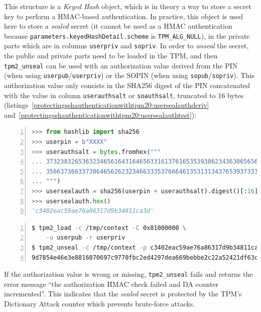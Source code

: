 This structure is a \emph{Keyed Hash} object, which is in theory a way
to store a secret key to perform a HMAC-based authentication. In
practice, this object is used here to store a \emph{sealed} secret (it
cannot be used as a HMAC authentication because
\texttt{parameters.keyedHashDetail.scheme} is
\texttt{TPM\_ALG\_NULL}), in the private parts which
are in columns \texttt{userpriv} and
\texttt{sopriv}. In order to \emph{unseal} the secret,
the public and private parts need to be loaded in the TPM, and then
\texttt{tpm2\_unseal} can be used with an authorization
value derived from the PIN (when using
\texttt{userpub}/\texttt{userpriv}) or
the SOPIN (when using
\texttt{sopub}/\texttt{sopriv}). This
authorization value only consists in the SHA256 digest of the PIN
concatenated with the value in column
\texttt{userauthsalt} or
\texttt{soauthsalt}, truncated to 16 bytes
(listings~\ref{protectingsshauthenticationwithtpm20:usersealauthderiv}
and~\ref{protectingsshauthenticationwithtpm20:usersealauthtest}):

\begin{lstlisting}[language=Python, numbers=left, caption={Python session which computes the authorization value of the \texttt{userpub} field, from the user PIN and \texttt{userauthsalt}}, label=protectingsshauthenticationwithtpm20:usersealauthderiv]
>>> from hashlib import sha256
>>> userpin = b"XXXX"
>>> userauthsalt = bytes.fromhex("""
... 3732383265363234656164316465633161376165353938623436306565633663
... 3566373663373064656262323466333537666461353131343765393733336534
... """)
>>> usersealauth = sha256(userpin + userauthsalt).digest()[:16]
>>> usersealauth.hex()
'c3402eac59ae76a86317d9b34811ca3d'
\end{lstlisting}

\begin{lstlisting}[language=sh, numbers=left, caption={Using the derived authorization value to unseal the \texttt{userpriv} field}, label=protectingsshauthenticationwithtpm20:usersealauthtest]
$ tpm2_load -c /tmp/context -C 0x81000000 \
    -u userpub -r userpriv
$ tpm2_unseal -c /tmp/context -p c3402eac59ae76a86317d9b34811ca3d
9d7854e46e3e8816070697c9770fbc2ed4297dea669bebbe2c22a52421df63cd
\end{lstlisting}

If the authorization value is wrong or missing,
\texttt{tpm2\_unseal} fails and returns the error
message ``the authorization HMAC check failed and DA counter
incremented''. This indicates that the \emph{sealed} secret is protected
by the TPM's Dictionary Attack counter which prevents brute-force
attacks.

